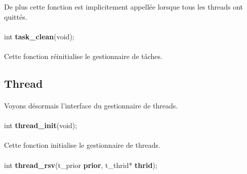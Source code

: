 \documentclass[10pt,a4wide]{article}
\begin{document}
De plus cette fonction est implicitement appell\'ee lorsque tous
les threads ont quitt\'es.

\paragraph{}

\hspace{1.5cm}int \textbf{task\_clean}(void);

\paragraph{}

Cette fonction r\'einitialise le gestionnaire de t\^aches.

\subsection{Thread}

\paragraph{}

Voyons d\'esormais l'interface du gestionnaire de threads.

\paragraph{}

\hspace{1.5cm}int \textbf{thread\_init}(void);

\paragraph{}

Cette fonction initialise le gestionnaire de threads.

\paragraph{}

\hspace{1.5cm}int \textbf{thread\_rsv}(t\_prior \textbf{prior},
                                       t\_thrid* \textbf{thrid});

\paragraph{}
\end{document}
